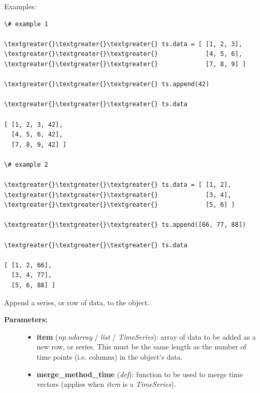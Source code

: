 \documentclass[letterpaper,10pt,english]{sphinxmanual}
\begin{document}
\begin{fulllineitems}
\begin{fulllineitems}
\begin{description}
\end{description}

Examples:

\begin{Verbatim}[commandchars=\\\{\}]
\# example 1

\textgreater{}\textgreater{}\textgreater{} ts.data = [ [1, 2, 3],
\textgreater{}\textgreater{}\textgreater{}             [4, 5, 6],
\textgreater{}\textgreater{}\textgreater{}             [7, 8, 9] ]
 
\textgreater{}\textgreater{}\textgreater{} ts.append(42)
 
\textgreater{}\textgreater{}\textgreater{} ts.data

[ [1, 2, 3, 42],
  [4, 5, 6, 42],
  [7, 8, 9, 42] ]

\# example 2
        
\textgreater{}\textgreater{}\textgreater{} ts.data = [ [1, 2],
\textgreater{}\textgreater{}\textgreater{}             [3, 4],
\textgreater{}\textgreater{}\textgreater{}             [5, 6] ]
        
\textgreater{}\textgreater{}\textgreater{} ts.append([66, 77, 88])

\textgreater{}\textgreater{}\textgreater{} ts.data

[ [1, 2, 66],
  [3, 4, 77],
  [5, 6, 88] ]
\end{Verbatim}

\end{fulllineitems}


\begin{fulllineitems}
\label{data_structures:time_series.TimeSeries.append_series}
Append a series, or row of data, to the object.
\begin{description}
\item[{\textbf{Parameters:}}] \leavevmode\begin{itemize}
\item {} 
\textbf{item} (\emph{np.ndarray} / \emph{list} / \emph{TimeSeries}): array of data to be added as a new row, or series. This must be the same length as the number of time points (i.e. columns) in the object's data.

\item {} 
\textbf{merge\_method\_time} (\emph{def}): function to be used to merge time vectors (applies when \emph{item} is a \emph{TimeSeries}).


\end{itemize}
\end{description}
\end{fulllineitems}
\end{fulllineitems}
\end{document}
